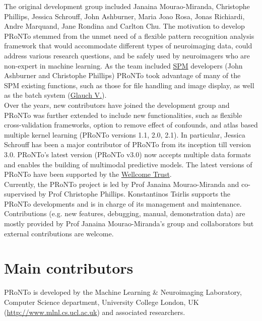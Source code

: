 The original development group included Janaina Mourao-Miranda, Christophe Phillips, Jessica Schrouff, John Ashburner, Maria Joao Rosa, Jonas Richiardi, Andre Marquand, Jane Rondina and Carlton Chu. The motivation to develop PRoNTo stemmed from the unmet need of a flexible pattern recognition analysis framework that would accommodate different types of neuroimaging data, could address various research questions, and be safely used by neuroimagers who are non-expert in machine learning. As the team included \href{https://www.fil.ion.ucl.ac.uk/spm/}{SPM} developers (John Ashburner and Christophe Phillips) PRoNTo took advantage of many of the SPM existing functions, such as those for file handling and image display, as well as the batch system (\href{https://sourceforge.net/projects/matlabbatch/}{Glauch V.}).
\\

Over the years, new contributors have joined the development group and PRoNTo was further extended to include new functionalities, such as flexible cross-validation frameworks, option to remove effect of confounds, and atlas based multiple kernel learning (PRoNTo versions 1.1, 2.0, 2.1). In particular, Jessica Schrouff has been a major contributor of PRoNTo from its inception till version 3.0. PRoNTo's latest version (PRoNTo v3.0) now accepts multiple data formats and enables the building of multimodal predictive models. The latest versions of PRoNTo have been supported by the \href{http://www.wellcome.org/}{Wellcome Trust}. 
\\

Currently, the PRoNTo project is led by Prof Janaina Mourao-Miranda and co-supervised by Prof Christophe Phillips. Konstantinos Tsirlis supports the PRoNTo developments and is in charge of its management and maintenance. Contributions (e.g. new features, debugging, manual, demonstration data) are mostly provided by Prof Janaina Mourao-Miranda's group and collaborators but external contributions are welcome.


\section{Main contributors}
PRoNTo is  developed by the Machine Learning \& Neuroimaging Laboratory, Computer Science department, University College London, UK (\url{http://www.mlnl.cs.ucl.ac.uk}) and associated researchers.

